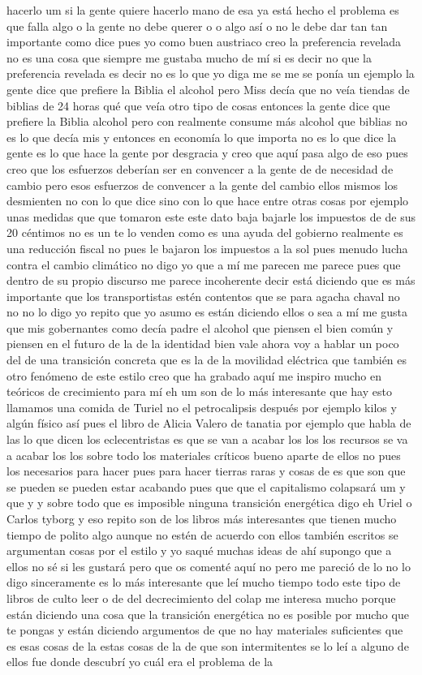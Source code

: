 hacerlo um si la gente quiere hacerlo mano de esa ya está hecho el problema es que falla algo o la gente no debe querer o o algo así o no le debe dar tan tan importante como dice pues yo como buen austriaco creo la preferencia revelada no es una cosa que siempre me gustaba mucho de mí si es decir no que la preferencia revelada es decir no es lo que yo diga me se me se ponía un ejemplo la gente dice que prefiere la Biblia el alcohol pero Miss decía que no veía tiendas de biblias de 24 horas qué que veía otro tipo de cosas entonces la gente dice que prefiere la Biblia alcohol pero con realmente consume más alcohol que biblias no es lo que decía mis y entonces en economía lo que importa no es lo que dice la gente es lo que hace la gente por desgracia y creo que aquí pasa algo de eso pues creo que los esfuerzos deberían ser en convencer a la gente de de necesidad de cambio pero esos esfuerzos de convencer a la gente del cambio ellos mismos los desmienten no con lo que dice sino con lo que hace entre otras cosas por ejemplo unas medidas que que tomaron este este dato baja bajarle los impuestos de de sus 20 céntimos no es un te lo venden como es una ayuda del gobierno realmente es una reducción fiscal no pues le bajaron los impuestos a la sol pues menudo lucha contra el cambio climático no digo yo que a mí me parecen me parece pues que dentro de su propio discurso me parece incoherente decir está diciendo que es más importante que los transportistas estén contentos que se para agacha chaval no no no lo digo yo repito que yo asumo es están diciendo ellos o sea a mí me gusta que mis gobernantes como decía padre el alcohol que piensen el bien común y piensen en el futuro de la de la identidad bien vale ahora voy a hablar un poco del de una transición concreta que es la de la movilidad eléctrica que también es otro fenómeno de este estilo creo que ha grabado aquí me inspiro mucho en teóricos de crecimiento para mí eh um son de lo más interesante que hay esto llamamos una comida de Turiel no el petrocalipsis después por ejemplo kilos y algún físico así pues el libro de Alicia Valero de tanatia por ejemplo que habla de las lo que dicen los eclecentristas es que se van a acabar los los los recursos se va a acabar los los sobre todo los materiales críticos bueno aparte de ellos no pues los necesarios para hacer pues para hacer tierras raras y cosas de es que son que se pueden se pueden estar acabando pues que que el capitalismo colapsará um y que y y sobre todo que es imposible ninguna transición energética digo eh Uriel o Carlos tyborg y eso repito son de los libros más interesantes que tienen mucho tiempo de polito algo aunque no estén de acuerdo con ellos también escritos se argumentan cosas por el estilo y yo saqué muchas ideas de ahí supongo que a ellos no sé si les gustará pero que os comenté aquí no pero me pareció de lo no lo digo sinceramente es lo más interesante que leí mucho tiempo todo este tipo de libros de culto leer o de del decrecimiento del colap me interesa mucho porque están diciendo una cosa que la transición energética no es posible por mucho que te pongas y están diciendo argumentos de que no hay materiales suficientes que es esas cosas de la estas cosas de la de que son intermitentes se lo leí a alguno de ellos fue donde descubrí yo cuál era el problema de la 